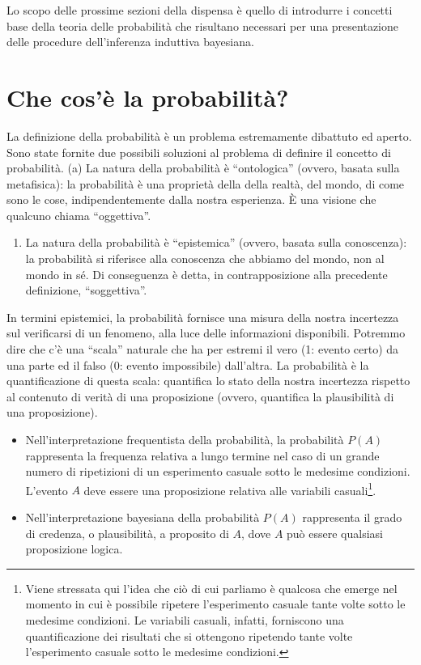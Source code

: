\documentclass[
  11pt,
]{krantz}
\providecommand{\tightlist}{%
  \setlength{\itemsep}{0pt}\setlength{\parskip}{0pt}}
\theoremstyle{definition}
\theoremstyle{definition}
\theoremstyle{definition}
\theoremstyle{definition}
\theoremstyle{remark}
\begin{document}
Lo scopo delle prossime sezioni della dispensa è quello di introdurre i concetti base della teoria delle probabilità che risultano necessari per una presentazione delle procedure dell'inferenza induttiva bayesiana.

\hypertarget{che-cosuxe8-la-probabilituxe0}{%
\section{Che cos'è la probabilità?}\label{che-cosuxe8-la-probabilituxe0}}

La definizione della probabilità è un problema estremamente dibattuto ed aperto. Sono state fornite due possibili soluzioni al problema di definire il concetto di probabilità. (a) La natura della probabilità è ``ontologica'' (ovvero, basata sulla metafisica): la probabilità è una proprietà della della realtà, del mondo, di come sono le cose, indipendentemente dalla nostra esperienza. È una visione che qualcuno chiama ``oggettiva''.

\begin{enumerate}
\def\labelenumi{(\alph{enumi})}
\setcounter{enumi}{1}
\tightlist
\item
  La natura della probabilità è ``epistemica'' (ovvero, basata sulla conoscenza): la probabilità si riferisce alla conoscenza che abbiamo del mondo, non al mondo in sé. Di conseguenza è detta, in contrapposizione alla precedente definizione, ``soggettiva''.
\end{enumerate}

In termini epistemici, la probabilità fornisce una misura della nostra incertezza sul verificarsi di un fenomeno, alla luce delle informazioni disponibili. Potremmo dire che c'è una ``scala'' naturale che ha per estremi il vero (1: evento certo) da una parte ed il falso (0: evento impossibile) dall'altra. La probabilità è la quantificazione di questa scala: quantifica lo stato della nostra incertezza rispetto al contenuto di verità di una proposizione (ovvero, quantifica la plausibilità di una proposizione).

\begin{itemize}
\tightlist
\item
  Nell'interpretazione frequentista della probabilità, la probabilità \(P(A)\) rappresenta la frequenza relativa a lungo termine nel caso di un grande numero di ripetizioni di un esperimento casuale sotto le medesime condizioni. L'evento \(A\) deve essere una proposizione relativa alle variabili casuali\footnote{Viene stressata qui l'idea che ciò di cui parliamo è qualcosa che emerge nel momento in cui è possibile ripetere l'esperimento casuale tante volte sotto le medesime condizioni. Le variabili casuali, infatti, forniscono una quantificazione dei risultati che si ottengono ripetendo tante volte l'esperimento casuale sotto le medesime condizioni.}.
\item
  Nell'interpretazione bayesiana della probabilità \(P(A)\) rappresenta il grado di credenza, o plausibilità, a proposito di \(A\), dove \(A\) può essere qualsiasi proposizione logica.
\end{itemize}
\end{document}
